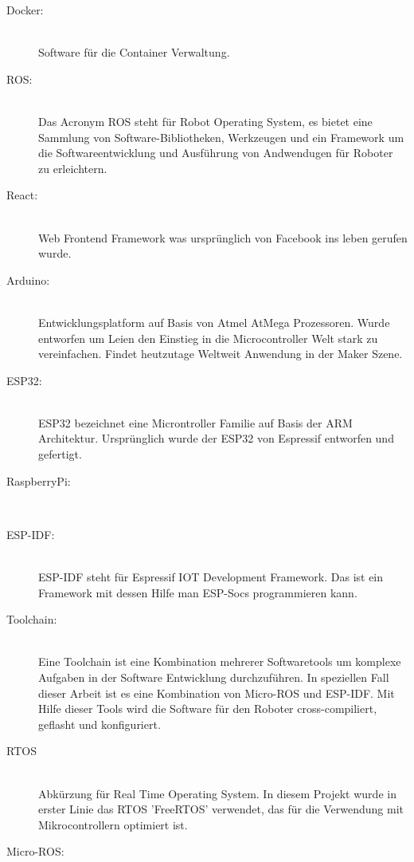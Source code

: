 \begin{flushleft}
    \begin{description}
        \item[Docker:]\hfill\\
        Software für die Container Verwaltung.

        \item[ROS:]\hfill\\
        Das Acronym ROS steht für Robot Operating System, es bietet eine Sammlung von Software-Bibliotheken, Werkzeugen und ein Framework um die Softwareentwicklung und Ausführung von Andwendugen für Roboter zu erleichtern.

        \item[React:]\hfill\\
        Web Frontend Framework was ursprünglich von Facebook ins leben gerufen wurde.

        \item[Arduino:]\hfill\\
        Entwicklungsplatform auf Basis von Atmel AtMega Prozessoren. Wurde entworfen um Leien den Einstieg in die Microcontroller
        Welt stark zu vereinfachen. Findet heutzutage Weltweit Anwendung in der Maker Szene.

        \item[ESP32:]\hfill\\
        ESP32 bezeichnet eine Microntroller Familie auf Basis der ARM Architektur.
        Ursprünglich wurde der ESP32 von Espressif entworfen und gefertigt.

        \item[RaspberryPi:]\hfill\\
        
        \item[ESP-IDF:]\hfill\\
        ESP-IDF steht für Espressif IOT Development Framework. Das ist ein Framework mit dessen Hilfe man ESP-Socs programmieren kann. \cite{esp_idf}
        
        \item[Toolchain:] \hfill\\
        Eine Toolchain ist eine Kombination mehrerer Softwaretools um komplexe Aufgaben in der Software Entwicklung durchzuführen.
        In speziellen Fall dieser Arbeit ist es eine Kombination von Micro-ROS und ESP-IDF.
        Mit Hilfe dieser Tools wird die Software für den Roboter cross-compiliert, geflasht und konfiguriert.

        \item[RTOS]\hfill\\
        Abkürzung für Real Time Operating System. 
        In diesem Projekt wurde in erster Linie das RTOS 'FreeRTOS' verwendet, das für die Verwendung mit Mikrocontrollern optimiert ist. \cite{freertos}
        
        \item[Micro-ROS:]\hfill\\

        

        \end{description}
\end{flushleft}